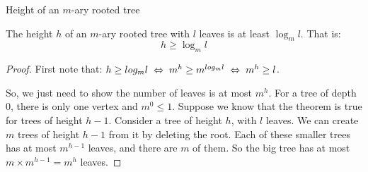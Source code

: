 \begin{frame}{Height of an $m$-ary rooted tree}
  
  \begin{theorem}
    The height $h$ of an $m$-ary rooted tree with $l$ leaves is at least $\log_m l$.
    That is:
    \[ h \geq \log_m l \]
  \end{theorem}
  
  \begin{proof}
    First note that: $h \geq log_m l \hspace{0.1cm} \Leftrightarrow \hspace{0.1cm} m^h \geq m^{log_m l} \hspace{0.1cm} \Leftrightarrow \hspace{0.1cm} m^h \geq l$.
    
    So, we just need to show the number of leaves is at most $m^h$.
    For a tree of depth 0, there is only one vertex and $m^0 \leq 1$.
    Suppose we know that the theorem is true for trees of height $h-1$.
    Consider a tree of height $h$, with $l$ leaves.
    We can create $m$ trees of height $h-1$ from it by deleting the root.
    Each of these smaller trees has at most $m^{h-1}$ leaves, and there are $m$ of them.
    So the big tree has at most $m \times m^{h-1} = m^h$ leaves.
    
    
    
  \end{proof}
  
\end{frame}
